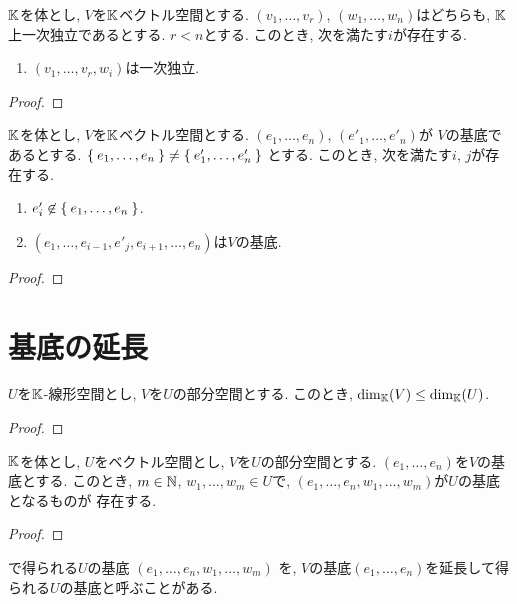\begin{prop}
$\mathbb{K}$を体とし,
  $V$を$\mathbb{K}$ベクトル空間とする.
  $(v_1,\ldots, v_r)$,
  $(w_1,\ldots, w_n)$はどちらも,
  $\mathbb{K}$上一次独立であるとする.  
$r<n$とする.
このとき, 次を満たす$i$が存在する.
\begin{enumerate}
\item $(v_1,\ldots,v_{r},w_{i})$は一次独立.
\end{enumerate}
\end{prop}
\begin{proof}\end{proof}

\begin{prop}
  $\mathbb{K}$を体とし,
  $V$を$\mathbb{K}$ベクトル空間とする.
  $(e_1,\ldots, e_n)$,
  $(e'_1,\ldots, e'_n)$が
  $V$の基底であるとする.
$\Set{e_1,\ldots, e_n}\neq \Set{e'_1,\ldots, e'_n}$
とする.
このとき, 次を満たす$i$, $j$が存在する.
\begin{enumerate}
\item $e'_i \not\in \Set{e_1,\ldots,e_n}$.
\item $(e_1,\ldots,e_{i-1},e'_{j},e_{i+1},\ldots,e_n)$は$V$の基底.
\end{enumerate}
\end{prop}
\begin{proof}\end{proof}


\section{基底の延長}
\label{sec:basis:ext}
\begin{prop}
  $U$を$\mathbb{K}$-線形空間とし,
  $V$を$U$の部分空間とする.
  このとき,  $\dim_{\mathbb{K}}(V) \leq \dim_{\mathbb{K}}(U)$.
\end{prop}
\begin{proof}\end{proof}


\begin{prop}
\label{prop:basis:ext}
  $\mathbb{K}$を体とし,
  $U$をベクトル空間とし,
  $V$を$U$の部分空間とする.
  $(e_1,\ldots,e_n)$を$V$の基底とする.
  このとき,
  $m\in \mathbb{N}$,
  $w_1,\ldots,w_m\in U$で,
  $(e_1,\ldots,e_n,w_1,\ldots,w_m)$が$U$の基底となるものが
  存在する.  
\end{prop}
\begin{proof}\end{proof}
\begin{remark}
で得られる$U$の基底
  $(e_1,\ldots,e_n,w_1,\ldots,w_m)$
  を,
  $V$の基底$(e_1,\ldots,e_n)$を延長して得られる$U$の基底と呼ぶことがある.
\end{remark}

